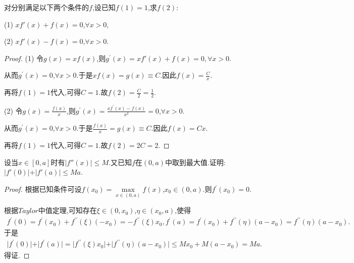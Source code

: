 \documentclass[lang=cn,newtx,10pt,scheme=chinese]{elegantbook}
\begin{document}
\begin{exercise}
    对分别满足以下两个条件的\(f\),设已知\(f(1)=1\),求\(f(2)\):

    (1) \(xf'(x)+f(x)=0\),\(\forall x > 0\),

    (2) \(xf'(x)-f(x)=0\),\(\forall x > 0\).
\end{exercise}
\begin{proof}
    (1) 令\(g(x) = xf(x)\),则\(g^{\prime}(x) =xf\prime\left( x \right) +f\left( x \right) =0,\forall x>0\).

从而\(g^{\prime}(x) = 0\),\(\forall x > 0\).于是\(xf(x) = g(x) \equiv C\).因此\(f(x) = \frac{C}{x}\).

再将\(f(1) = 1\)代入,可得\(C = 1\).故\(f(2) = \frac{C}{2} = \frac{1}{2}\).

(2) 令\(g(x) = \frac{f(x)}{x}\),则\(g^{\prime}(x) = \frac{xf^{\prime}(x) - f(x)}{x^2} = 0\),\(\forall x > 0\).

从而\(g^{\prime}(x) = 0\),\(\forall x > 0\).于是\(\frac{f(x)}{x} = g(x) \equiv C\).因此\(f(x) = Cx\).

再将\(f(1) = 1\)代入,可得\(C = 1\).故\(f(2) = 2C = 2\). 
\end{proof}

\begin{exercise}
    设当\(x\in[0,a]\)时有\(\vert f''(x)\vert\leqslant M\).又已知\(f\)在\((0,a)\)中取到最大值.证明:
    \(\vert f'(0)\vert+\vert f'(a)\vert\leqslant Ma\).
\end{exercise}
\begin{proof}
    根据已知条件可设\(f(x_0)=\underset{x\in (0,a)}{\max}f(x)\),\(x_0\in (0,a)\).则\(f^{\prime}(x_0)=0\).

根据\(Taylor\)中值定理,可知存在\(\xi \in (0,x_0)\),\(\eta \in (x_0,a)\),使得
\begin{align*}
    f^{\prime}(0)=f^{\prime}(x_0)+f^{\prime\prime}(\xi)(-x_0)=-f^{\prime\prime}(\xi)x_0,
f^{\prime}(a)=f^{\prime}(x_0)+f^{\prime\prime}(\eta)(a - x_0)=f^{\prime\prime}(\eta)(a - x_0).
\end{align*}
于是
\begin{align*}
    \vert f^{\prime}(0)\vert+\vert f^{\prime}(a)\vert=\vert f^{\prime\prime}(\xi)x_0\vert+\vert f^{\prime\prime}(\eta)(a - x_0)\vert\leqslant Mx_0 + M(a - x_0)=Ma.
\end{align*}
得证.
\end{proof}
\end{document}
